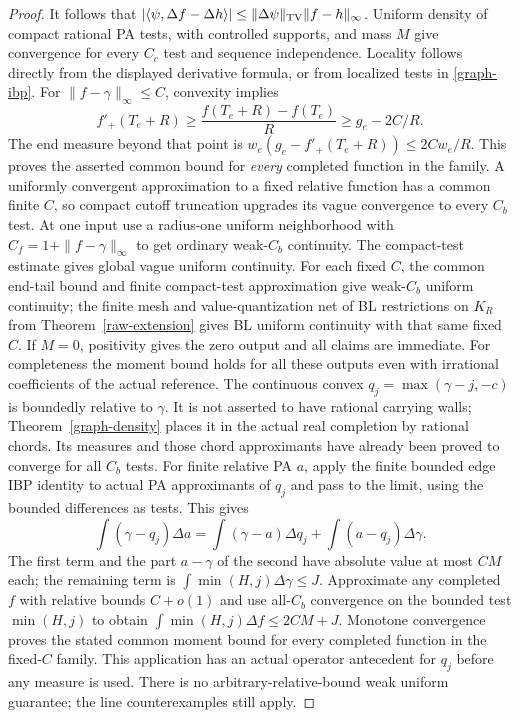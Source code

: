 \documentclass[11pt]{article}
\begin{document}
\begin{proof}
It follows that
$|\langle\psi,\Delta f-\Delta h\rangle|
\leq\|\Delta\psi\|_{\rm TV}\|f-h\|_\infty$.
Uniform density of compact rational PA tests, with controlled supports,
and mass $M$ give convergence for every $C_c$ test and sequence
independence. Locality follows directly from the displayed derivative
formula, or from localized tests in \eqref{graph-ibp}.
For $\|f-\gamma\|_\infty\leq C$, convexity implies
\[
 f'_+(T_e+R)\geq\frac{f(T_e+R)-f(T_e)}R
                         \geq g_e-2C/R.
\]
The end measure beyond that point is
$w_e(g_e-f'_+(T_e+R))\leq2Cw_e/R$.
This proves the asserted common bound for \emph{every} completed function
in the family. A uniformly convergent approximation to a fixed relative
function has a common finite $C$, so compact cutoff truncation upgrades
its vague convergence to every $C_b$ test. At one input use a radius-one
uniform neighborhood with $C_f=1+\|f-\gamma\|_\infty$ to get ordinary
weak-$C_b$ continuity. The compact-test estimate gives global vague
uniform continuity. For each fixed $C$, the common end-tail bound and
finite compact-test approximation give weak-$C_b$ uniform continuity;
the finite mesh and value-quantization net of BL restrictions on $K_R$
from Theorem~\ref{raw-extension} gives BL uniform continuity with
that same fixed $C$. If $M=0$, positivity gives the zero output and
all claims are immediate.
For completeness the moment bound holds for all these outputs even with
irrational coefficients of the actual reference. The continuous convex
$q_j=\max(\gamma-j,-c)$ is boundedly relative to $\gamma$.
It is not asserted to have rational carrying walls; Theorem~\ref{graph-density}
places it in the actual real completion by rational chords. Its measures
and those chord approximants have already been proved to converge for
all $C_b$ tests. For finite relative PA $a$, apply the finite bounded
edge IBP identity to actual PA approximants of $q_j$ and pass to the
limit, using the bounded differences as tests. This gives
\[
 \int(\gamma-q_j)\Delta a
 =\int(\gamma-a)\Delta q_j+\int(a-q_j)\Delta\gamma.
\]
The first term and the part $a-\gamma$ of the second have absolute
value at most $CM$ each; the remaining term is
$\int\min(H,j)\Delta\gamma\leq J$.
Approximate any completed $f$ with relative bounds $C+o(1)$ and use
all-$C_b$ convergence on the bounded test $\min(H,j)$ to obtain
$\int\min(H,j)\Delta f\leq2CM+J$. Monotone convergence proves
the stated common moment bound for every completed function in the
fixed-$C$ family. This application has an actual operator antecedent
for $q_j$ before any measure is used.
There is no arbitrary-relative-bound weak
uniform guarantee; the line counterexamples still apply.
\end{proof}
\end{document}
